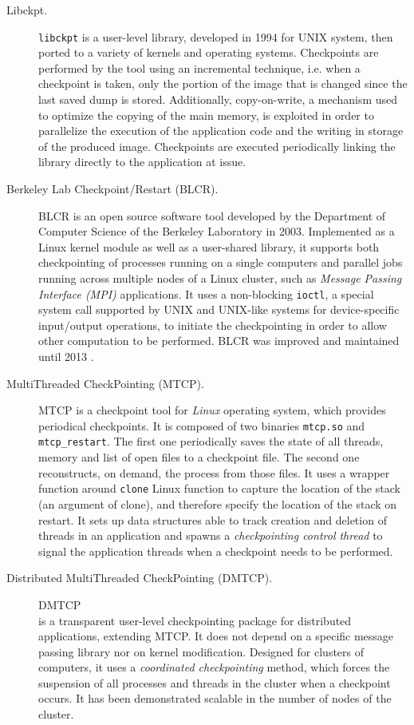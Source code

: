 \begin{description}
    \item[Libckpt.] \verb|libckpt| \cite{260469} is a user-level library, developed in 1994 for UNIX system, then ported to a variety of kernels and operating systems. Checkpoints are performed by the tool using an incremental technique, i.e. when a checkpoint is taken, only the portion of the image that is changed since the last saved dump is stored. Additionally, copy-on-write, a mechanism used to optimize the copying of the main memory, is exploited in order to parallelize the execution of the application code and the writing in storage of the produced image. Checkpoints are executed periodically linking the library directly to the application at issue.
    \item[Berkeley Lab Checkpoint/Restart (BLCR).] BLCR \cite{duell2005design} is an open source software tool developed by the  Department  of  Computer  Science  of  the  Berkeley  Laboratory in 2003. Implemented as a Linux kernel module as well as a user-shared library, it supports both checkpointing of processes running on a single computers and parallel jobs running across multiple nodes of a Linux cluster, such as \emph{Message Passing Interface (MPI)} applications. It uses a non-blocking \verb|ioctl|, a special system call supported by UNIX and UNIX-like systems for device-specific input/output operations, to initiate the checkpointing in order to allow other computation to be performed. BLCR was improved and maintained until 2013 \cite{reghenzani_2016}.
    \item[MultiThreaded CheckPointing (MTCP).] MTCP \cite{Rieker06transparentuser-level} is a  checkpoint tool for \emph{Linux} operating system, which provides periodical checkpoints. It is composed of two binaries \verb|mtcp.so| and \verb|mtcp_restart|. The first one periodically saves the state of all threads, memory and list of open files to a checkpoint file. The second one reconstructs, on demand, the process from those files. It uses a wrapper function around \verb|clone| Linux function to capture the location of the stack (an argument of clone), and therefore specify the location of the stack on restart. It sets up data structures able to track creation and deletion of threads in an application and spawns a \emph{checkpointing control thread} to signal the application threads when a checkpoint needs to be performed. 
    \item[Distributed MultiThreaded CheckPointing (DMTCP).] DMTCP \\\cite{5161063} is a transparent user-level checkpointing package for distributed applications, extending MTCP. It does not depend on a specific message passing library nor on kernel modification. Designed for clusters of computers, it uses a \emph{coordinated checkpointing} method, which forces the suspension of all processes and threads in the cluster when a checkpoint occurs. It has been demonstrated scalable in the number of nodes of the cluster.

\end{description}
